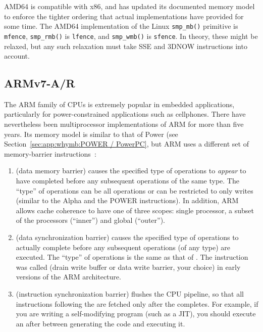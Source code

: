 AMD64 is compatible with x86, and has updated its documented memory
model~\cite{AMDOpteron:2:2007}
to enforce the tighter ordering that actual implementations have
provided for some time.
The AMD64 implementation of the Linux {\tt smp\_mb()} primitive is {\tt mfence},
{\tt smp\_rmb()} is {\tt lfence}, and {\tt smp\_wmb()} is {\tt sfence}.
In theory, these might be relaxed, but any such relaxation must take
SSE and 3DNOW instructions into account.

\subsection{ARMv7-A/R}

The ARM family of CPUs is extremely popular in embedded applications,
particularly for power-constrained applications such as cellphones.
There have nevertheless been multiprocessor implementations of ARM
for more than five years.
Its memory model is similar to that of Power
(see Section~\ref{sec:app:whymb:POWER / PowerPC}, but ARM uses a
different set of memory-barrier instructions~\cite{ARMv7A:2010}:

\begin{enumerate}
\item	{} (data memory barrier) causes the specified type of
	operations to \emph{appear} to have completed before any
	subsequent operations of the same type.
	The ``type'' of operations can be all operations or can be
	restricted to only writes (similar to the Alpha 
	and the POWER  instructions).
	In addition, ARM allows cache coherence to have one of three
	scopes: single processor, a subset of the processors
	(``inner'') and global (``outer'').
\item	{} (data synchronization barrier) causes the specified
	type of operations to actually complete before any subsequent
	operations (of any type) are executed.
	The ``type'' of operations is the same as that of .
	The  instruction was called  (drain write buffer
	or data write barrier, your choice) in early versions of the
	ARM architecture.
\item	{} (instruction synchronization barrier) flushes the CPU
	pipeline, so that all instructions following the 
	are fetched only after the  completes.
	For example, if you are writing a self-modifying program
	(such as a JIT), you should execute an  after
	between generating the code and executing it.
\end{enumerate}

